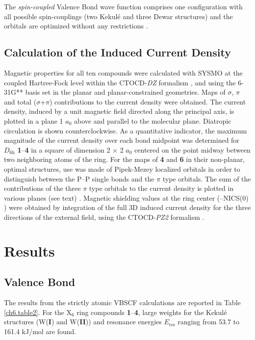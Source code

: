 The \textit{spin-coupled} Valence Bond wave function comprises one configuration
with all possible spin-couplings (two Kekul\'e and three Dewar structures) and
the orbitals are optimized without any restrictions \cite{scvb1,scvb2}.

\subsection{Calculation of the Induced Current Density}

Magnetic properties for all ten compounds were calculated with
SYSMO \cite{sysmo} at the coupled Hartree-Fock level within the
CTOCD-\textit{DZ}
formalism \cite{ctocd-dz2,ctocd-dz3,big,small,ctocd-dz1,ctocd-dz4}, and using
the \mbox{6-31G**} basis set \cite{bs6_light,bs6_heavy,bs31light_a,bs31light_b,bs31heavyss}
in the planar and planar-constrained geometries. Maps of $\sigma$, $\pi$ and total
($\sigma$+$\pi$) contributions to the current density were obtained. The
current density, induced by a unit magnetic field directed along the principal
axis, is plotted in a plane 1 $a_0$ above and parallel to the molecular plane.
Diatropic circulation is shown counterclockwise. As a quantitative indicator,
the maximum magnitude of the current density over each bond midpoint was
determined for $D_\mathrm{6h}$ \textbf{1}--\textbf{4}  in a square of dimension
2 $\times$ 2 $a_0$ centered on the point
midway between two neighboring atoms of the ring. 
For the maps of \textbf{4} and \textbf{6} in their non-planar, optimal structures, use was made of 
Pipek-Mezey \cite{pipek} localized orbitals in order to distinguish between the P--P single bonds
and the $\pi$ type orbitals.  The sum of the contributions of the three $\pi$ type orbitals
to the current density is plotted in various planes (see text) \cite{fowler2}.
Magnetic shielding values
at the ring center (--NICS(0) \cite{nics}) were obtained by
integration of the full 3D induced current density for the three directions of the external field,
using the CTOCD-\textit{PZ2} formalism \cite{ctocd-pz,soncini2}.

\section{Results}

\subsection{Valence Bond}

The results from the strictly atomic VBSCF calculations are reported in
Table \ref{ch6.table2}. For the X$_6$ ring compounds \textbf{1}--\textbf{4},
large weights for the Kekul\'e structures (W(\textbf{I}) and
W(\textbf{II})) and resonance energies $E_{\mathrm{res}}$ ranging
from 53.7 to 161.4 kJ/mol are found. 


